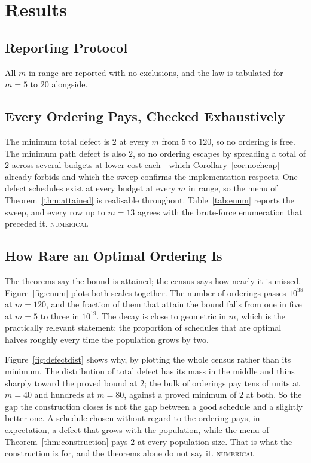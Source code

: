 \documentclass[conference]{IEEEtran}
\theoremstyle{definition}
\newcommand{\NUM}{\textsc{numerical}}
\begin{document}
\section{Results}
\label{sec:results}

\subsection{Reporting Protocol}

All $m$ in range are reported with no exclusions, and the law is tabulated for $m=5$ to $20$
alongside.

\subsection{Every Ordering Pays, Checked Exhaustively}

The minimum total defect is $2$ at every $m$ from $5$ to $120$, so no ordering is free. The
minimum path defect is also $2$, so no ordering escapes by spreading a total of $2$ across
several budgets at lower cost each---which Corollary~\ref{cor:nocheap} already forbids and
which the sweep confirms the implementation respects. One-defect schedules exist at every
budget at every $m$ in range, so the menu of Theorem~\ref{thm:attained} is realisable
throughout. Table~\ref{tab:enum} reports the sweep, and every row up to $m=13$ agrees with the
brute-force enumeration that preceded it. \NUM{}



\subsection{How Rare an Optimal Ordering Is}

The theorems say the bound is attained; the census says how nearly it is missed.
Figure~\ref{fig:enum} plots both scales together. The number of orderings passes $10^{38}$ at
$m=120$, and the fraction of them that attain the bound falls from one in five at $m=5$ to
three in $10^{19}$. The decay is close to geometric in $m$, which is the practically relevant
statement: the proportion of schedules that are optimal halves roughly every time the
population grows by two.

Figure~\ref{fig:defectdist} shows why, by plotting the whole census rather than its minimum.
The distribution of total defect has its mass in the middle and thins sharply toward the
proved bound at $2$; the bulk of orderings pay tens of units at $m=40$ and hundreds at
$m=80$, against a proved minimum of $2$ at both. So the gap the construction closes is not
the gap between a good schedule and a slightly better one. A schedule chosen without regard
to the ordering pays, in expectation, a defect that grows with the population, while the
menu of Theorem~\ref{thm:construction} pays $2$ at every population size. That is what the
construction is for, and the theorems alone do not say it. \NUM{}
\end{document}
